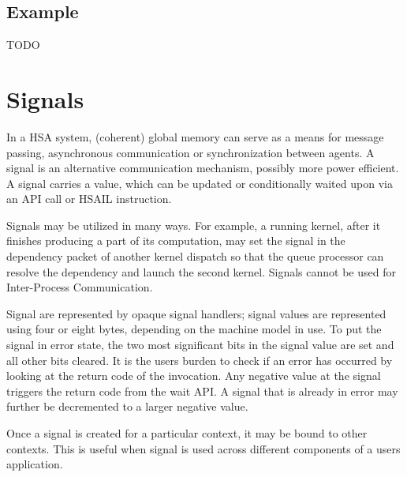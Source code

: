 \documentclass[draft]{book}
\newcommand{\mariotodo}[1]{\todo[color=CarnationPink]{#1}}
\begin{document}

% 

\hypertarget{topology_example}{} \subsection{Example}
TODO

\hypertarget{signals}{}\section{Signals}
\label{signals}

In a HSA system, (coherent) global memory can serve as a means for message
passing, asynchronous communication or synchronization between agents. A signal
is an alternative communication mechanism, possibly more power efficient. A
signal carries a value, which can be updated or conditionally waited upon via an
API call or HSAIL instruction.

Signals may be utilized in many ways. For example, a running kernel, after it
finishes producing a part of its computation, may set the signal in the
dependency packet of another kernel dispatch so that the queue processor can
resolve the dependency and launch the second kernel. Signals cannot be used for
Inter-Process Communication.

Signal are represented by opaque signal handlers; signal values are represented
using four or eight bytes, depending on the machine model in use. To put the
signal in error state, the two most significant bits in the signal value are set
and all other bits cleared. It is the users burden to check if an error has
occurred by looking at the return code of the 
invocation. Any negative value at the signal triggers the
 return code from the wait API. A signal that is
already in error may further be decremented to a larger negative value.

\mariotodo{signal creation missing}Once a signal is created for a particular
context, it may be bound to other contexts. This is useful when signal is used
across different components of a users application.
\end{document}
